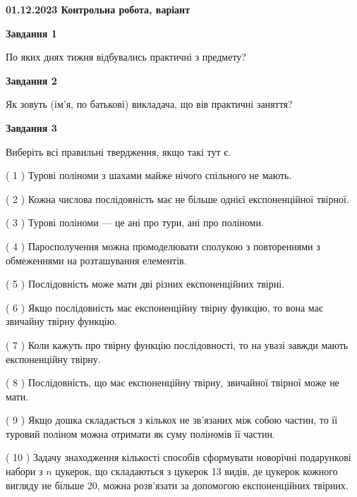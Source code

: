 \documentclass[12pt, ukrainian]{article}
\begin{document}
\begin {large}

\textbf{01.12.2023 Контрольна робота, варіант  }\par


{
{\begin {center}\textbf{Завдання 1}\end {center}}\par
По яких днях тижня відбувались практичні з предмету?\par
{\begin {center}\textbf{Завдання 2}\end {center}}\par
Як зовуть (ім'я, по батькові) викладача, що вів практичні заняття?\par
{\begin {center}\textbf{Завдання 3}\end {center}}\par
Виберіть всі правильні твердження, якщо такі тут є.\par
\vspace{2mm}
( 1 ) Турові поліноми з шахами майже нічого спільного не мають.%

( 2 ) Кожна числова послідовність має не більше однієї  експоненційної твірної.%

( 3 ) Турові поліноми --- це ані про тури, ані про поліноми.%

( 4 ) Паросполучення можна промоделювати сполукою з повтореннями з обмеженнями на розташування елементів.%

( 5 ) Послідовність може мати дві різних експоненційних твірні.%

( 6 ) Якщо послідовність має експоненційну твірну функцію, то вона має звичайну твірну функцію.%

( 7 ) Коли кажуть про твірну функцію послідовності, то на увазі завжди мають експоненційну твірну.%

( 8 ) Послідовність, що має експоненційну твірну, звичайної твірної може не мати.%

( 9 ) Якщо дошка складається з кількох не зв’язаних між собою частин, то її туровий поліном можна отримати як суму поліномів її частин.%

( 10 ) Задачу знаходження кількості способів сформувати новорічні подарункові набори з $n$ цукерок, що складаються з цукерок 13 видів, де цукерок кожного вигляду не більше 20, можна розв’язати за допомогою експоненційних твірних.%
}
\end {large}

\vspace{4mm}
\newpage
\end{document}
